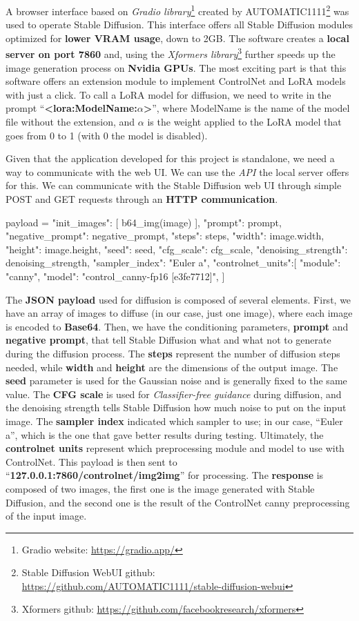 \documentclass[preprint]{elsarticle}
\begin{document}
A browser interface based on \emph{Gradio library}\footnote{Gradio website: \url{https://gradio.app/}} 
created by AUTOMATIC1111\footnote{Stable Diffusion WebUI github: \url{https://github.com/AUTOMATIC1111/stable-diffusion-webui}} 
was used to operate Stable Diffusion. 
This interface offers all Stable Diffusion modules optimized for \textbf{lower VRAM usage}, down to 2GB. 
The software creates a \textbf{local server on port 7860} and, 
using the \emph{Xformers library}\footnote{Xformers github: \url{https://github.com/facebookresearch/xformers}} 
further speeds up the image generation process on \textbf{Nvidia GPUs}.
The most exciting part is that this software offers an extension module to 
implement ControlNet and LoRA models with just a click. 
To call a LoRA model for diffusion, we need to write in the prompt ``\textbf{<lora:ModelName:$\alpha$>}'', 
where ModelName is the name of the model file without the extension, 
and $\alpha$ is the weight applied to the LoRA model that goes from 0 to 1 (with 0 the model is disabled). 

Given that the application developed for this project is standalone, 
we need a way to communicate with the web UI. We can use the \emph{API}  
the local server offers for this.
We can communicate with the Stable Diffusion web UI through simple 
POST and GET requests through an \textbf{HTTP communication}. 
\begin{python}
	payload = {
		"init_images": [
		b64_img(image)
		],
		"prompt": prompt,
		"negative_prompt": negative_prompt,
		"steps": steps,
		"width": image.width,
		"height": image.height,
		"seed": seed,
		"cfg_scale": cfg_scale,
		"denoising_strength": denoising_strength,
		"sampler_index": "Euler a",
		"controlnet_units":[
		{
			"module": "canny",
			"model": "control_canny-fp16 [e3fe7712]",
		}
		]
	}
\end{python}
The \textbf{JSON payload} used for diffusion is composed of several elements.
First, we have an array of images to diffuse (in our case, just one image), 
where each image is encoded to \textbf{Base64}. 
Then, we have the conditioning parameters, \textbf{prompt} and \textbf{negative prompt}, 
that tell Stable Diffusion what and what not to generate during the diffusion process. 
The \textbf{steps} represent the number of diffusion steps needed, while \textbf{width} 
and \textbf{height} are the dimensions of the output image. 
The \textbf{seed} parameter is used for the Gaussian noise and is generally fixed to the same value. 
The \textbf{CFG scale} is used for \emph{Classifier-free guidance} during diffusion, 
and the denoising strength tells Stable Diffusion how much noise to put on the input image. 
The \textbf{sampler index} indicated which sampler to use; in our case, ``Euler a'', 
which is the one that gave better results during testing.
Ultimately, the \textbf{controlnet units} represent which preprocessing module and model to use with ControlNet.
This payload is then sent to ``\textbf{127.0.0.1:7860/controlnet/img2img}'' for processing. 
The \textbf{response} is composed of two images, the first one is the image generated with Stable Diffusion, 
and the second one is the result of the ControlNet canny preprocessing of the input image.
\end{document}
